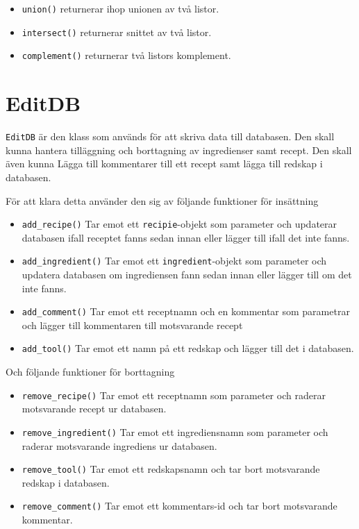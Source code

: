 \begin{itemize}
\item \verb+union()+ returnerar ihop unionen av två listor.
\item \verb+intersect()+ returnerar snittet av två listor.
\item \verb+complement()+ returnerar två listors komplement.
\end{itemize}


\section{EditDB}

\verb+EditDB+ är den klass som används för att skriva data till databasen. Den
skall kunna hantera tilläggning och borttagning av ingredienser samt recept. Den
skall även kunna Lägga till kommentarer till ett recept samt lägga till redskap
i databasen.

För att klara detta använder den sig av följande funktioner för insättning

\begin{itemize}
\item \verb+add_recipe()+ Tar emot ett \verb+recipie+-objekt som parameter och
  updaterar databasen ifall receptet fanns sedan innan eller lägger till ifall
  det inte fanns.

\item \verb+add_ingredient()+ Tar emot ett \verb+ingredient+-objekt som
  parameter och updatera databasen om ingrediensen fann sedan innan eller lägger
  till om det inte fanns.

\item \verb+add_comment()+ Tar emot ett receptnamn och en kommentar som
  parametrar och lägger till kommentaren till motsvarande recept

\item \verb+add_tool()+ Tar emot ett namn på ett redskap och lägger till det i
  databasen.

\end{itemize}

Och följande funktioner för borttagning

\begin{itemize}

\item \verb+remove_recipe()+ Tar emot ett receptnamn som parameter och raderar
  motsvarande recept ur databasen.

\item \verb+remove_ingredient()+ Tar emot ett ingrediensnamn som parameter och
  raderar motsvarande ingrediens ur databasen.

\item \verb+remove_tool()+ Tar emot ett redskapsnamn och tar bort motsvarande
  redskap i databasen.

\item \verb+remove_comment()+ Tar emot ett kommentars-id och tar bort
  motsvarande kommentar.
  
\end{itemize}

